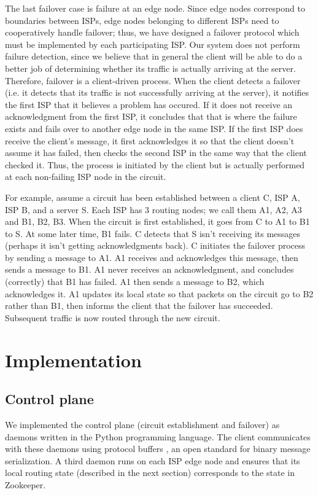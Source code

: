 \documentclass{article}
\begin{document}
The last failover case is failure at an edge node. Since edge nodes
correspond to boundaries between ISPs, edge nodes belonging to
different ISPs need to cooperatively handle failover; thus, we have
designed a failover protocol which must be implemented by each
participating ISP.  Our system does not perform failure detection,
since we believe that in general the client will be able to do a
better job of determining whether its traffic is actually arriving at
the server. Therefore, failover is a client-driven process. When the
client detects a failover (i.e. it detects that its traffic is not
successfully arriving at the server), it notifies the first ISP that
it believes a problem has occured. If it does not receive an
acknowledgment from the first ISP, it concludes that that is where the
failure exists and fails over to another edge node in the same ISP. If
the first ISP does receive the client's message, it first acknowledges
it so that the client doesn't assume it has failed, then checks the
second ISP in the same way that the client checked it. Thus, the
process is initiated by the client but is actually performed at each
non-failing ISP node in the circuit.

For example, assume a circuit has been established between a client C,
ISP A, ISP B, and a server S. Each ISP has 3 routing nodes; we call
them A1, A2, A3 and B1, B2, B3. When the circuit is first established,
it goes from C to A1 to B1 to S. At some later time, B1 fails. C
detects that S isn't receiving its messages (perhaps it isn't getting
acknowledgments back). C initiates the failover process by sending a
message to A1. A1 receives and acknowledges this message, then sends a
message to B1. A1 never receives an acknowledgment, and concludes
(correctly) that B1 has failed. A1 then sends a message to B2, which
acknowledges it. A1 updates its local state so that packets on the
circuit go to B2 rather than B1, then informs the client that the
failover has succeeded. Subsequent traffic is now routed through the
new circuit.

\section{Implementation}
\subsection{Control plane}
We implemented the control plane (circuit establishment and failover)
as daemons written in the Python programming language. The client
communicates with these daemons using protocol buffers
\cite{protobuf}, an open standard for binary message serialization. A
third daemon runs on each ISP edge node and ensures that its local
routing state (described in the next section) corresponds to the state
in Zookeeper.
\end{document}

